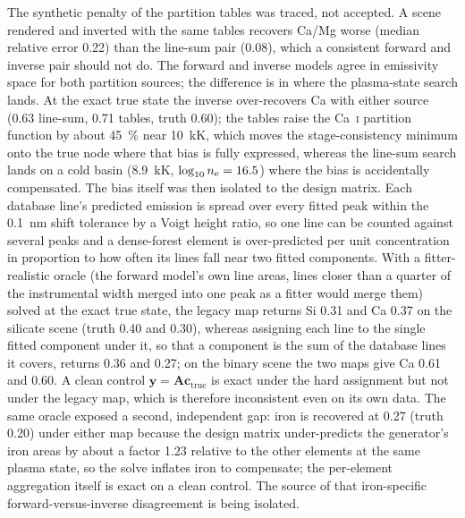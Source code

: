 The synthetic penalty of the partition tables was traced, not accepted. A scene rendered and
inverted with the same tables recovers Ca/Mg worse (median relative error 0.22) than the
line-sum pair (0.08), which a consistent forward and inverse pair should not do. The forward and
inverse models agree in emissivity space for both partition sources; the difference is in where
the plasma-state search lands. At the exact true state the inverse over-recovers Ca with either
source (0.63 line-sum, 0.71 tables, truth 0.60); the tables raise the Ca~\textsc{i} partition
function by about \SI{45}{\percent} near \SI{10}{\kilo\kelvin}, which moves the stage-consistency
minimum onto the true node where that bias is fully expressed, whereas the line-sum search lands
on a cold basin (\SI{8.9}{\kilo\kelvin}, $\log_{10}n_{\mathrm{e}}=16.5$) where the bias is accidentally
compensated. %
The bias itself was then isolated to the design matrix. Each database line's predicted emission
is spread over every fitted peak within the \SI{0.1}{\nano\meter} shift tolerance by a Voigt
height ratio, so one line can be counted against several peaks and a dense-forest element is
over-predicted per unit concentration in proportion to how often its lines fall near two fitted
components. With a fitter-realistic oracle (the forward model's own line areas, lines closer than a
quarter of the instrumental width merged into one peak as a fitter would merge them) solved at the
exact true state, the legacy map returns Si 0.31 and Ca 0.37 on the silicate scene (truth 0.40 and
0.30), whereas assigning each line to the single fitted component under it, so that a component is
the sum of the database lines it covers, returns 0.36 and 0.27; on the binary scene the two maps
give Ca 0.61 and 0.60. A clean control $\mathbf{y}=\mathbf{A}\mathbf{c}_\mathrm{true}$ is exact
under the hard assignment but not under the legacy map, which is therefore inconsistent even on
its own data. %
The same oracle exposed a second, independent gap: iron is recovered at 0.27 (truth 0.20) under
either map because the design matrix under-predicts the generator's iron areas by about a factor
1.23 relative to the other elements at the same plasma state, so the solve inflates iron to
compensate; the per-element aggregation itself is exact on a clean control. The source of that
iron-specific forward-versus-inverse disagreement is being isolated. %
